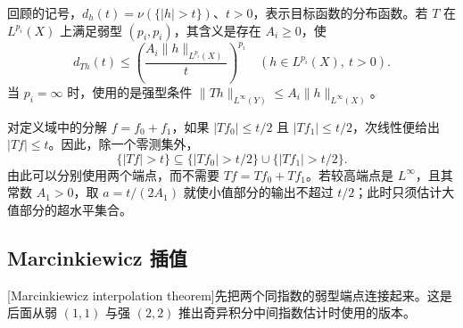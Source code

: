 回顾的记号，\(d_h(t)=\nu(\{|h|>t\})\)、\(t>0\)，表示目标函数的分布函数。若 \(T\) 在 \(L^{p_i}(X)\) 上满足弱型 \((p_i,p_i)\)，其含义是存在 \(A_i\geq0\)，使
\[
 d_{Th}(t)\leq
 \left(\dfrac{A_i\|h\|_{L^{p_i}(X)}}{t}\right)^{p_i}
 \quad(h\in L^{p_i}(X),\ t>0).
\]
当 \(p_i=\infty\) 时，使用的是强型条件
\(\|Th\|_{L^\infty(Y)}\leq A_i\|h\|_{L^\infty(X)}\)。

\ProseParagraphBreak

对定义域中的分解 \(f=f_0+f_1\)，如果 \(|Tf_0|\leq t/2\) 且 \(|Tf_1|\leq t/2\)，次线性便给出 \(|Tf|\leq t\)。因此，除一个零测集外，
\[
 \{|Tf|>t\}\subseteq
 \{|Tf_0|>t/2\}\cup\{|Tf_1|>t/2\}.
\]
由此可以分别使用两个端点，而不需要 \(Tf=Tf_0+Tf_1\)。若较高端点是 \(L^\infty\)，且其常数 \(A_1>0\)，取 \(a=t/(2A_1)\) 就使小值部分的输出不超过 \(t/2\)；此时只须估计大值部分的超水平集合。

\subsection{Marcinkiewicz 插值}
\label{b2:subsec:170303}

[Marcinkiewicz interpolation theorem]先把两个同指数的弱型端点连接起来。这是后面从弱 \((1,1)\) 与强 \((2,2)\) 推出奇异积分中间指数估计时使用的版本。

